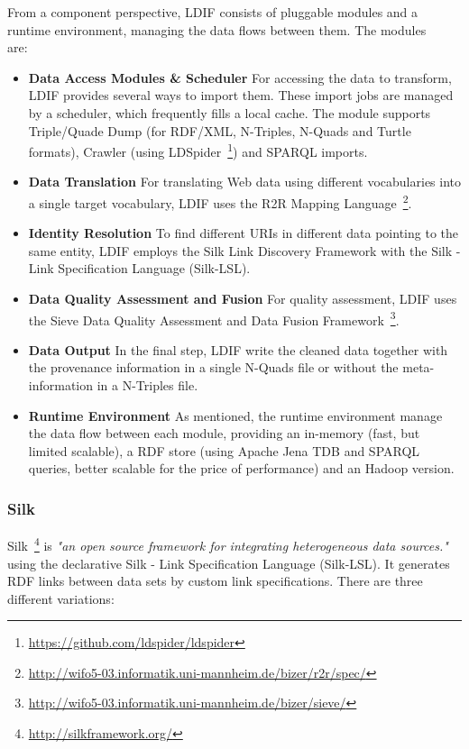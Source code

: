 From a component perspective, LDIF consists of pluggable modules and a runtime environment, managing the data flows between them. The modules are:~\cite{schultz2011ldif}~\cite{schultz2012ldif}

\begin{itemize}

\item \textbf{Data Access Modules \& Scheduler}
For accessing the data to transform, LDIF provides several ways to import them. These import jobs are managed by a scheduler, which frequently fills a local cache. The module supports Triple/Quade Dump (for RDF/XML, N-Triples, N-Quads and Turtle formats), Crawler (using LDSpider~\footnote{\url{https://github.com/ldspider/ldspider}}) and SPARQL imports.

\item \textbf{Data Translation}
For translating Web data using different vocabularies into a single target vocabulary, LDIF uses the R2R Mapping Language~\footnote{\url{http://wifo5-03.informatik.uni-mannheim.de/bizer/r2r/spec/}}.

\item \textbf{Identity Resolution}
To find different URIs in different data pointing to the same entity, LDIF employs the Silk Link Discovery Framework with the Silk - Link Specification Language (Silk-LSL).

\item \textbf{Data Quality Assessment and Fusion}
For quality assessment, LDIF uses the Sieve Data Quality Assessment and Data Fusion Framework~\footnote{\url{http://wifo5-03.informatik.uni-mannheim.de/bizer/sieve/}}.

\item \textbf{Data Output}
In the final step, LDIF write the cleaned data together with the provenance information in a single N-Quads file or without the meta-information in a N-Triples file.
\item \textbf{Runtime Environment} 
As mentioned, the runtime environment manage the data flow between each module, providing an in-memory (fast, but limited scalable), a RDF store (using Apache Jena TDB and SPARQL queries, better scalable for the price of performance) and an Hadoop version.

\end{itemize}

\subsubsection{Silk}\label{silk}
Silk~\footnote{\url{http://silkframework.org/}} is \emph{"an open source framework for integrating heterogeneous data sources."} using the declarative Silk - Link Specification Language (Silk-LSL). It generates RDF links between data sets by custom link specifications. There are three different variations:~\cite{isele2010silk}

